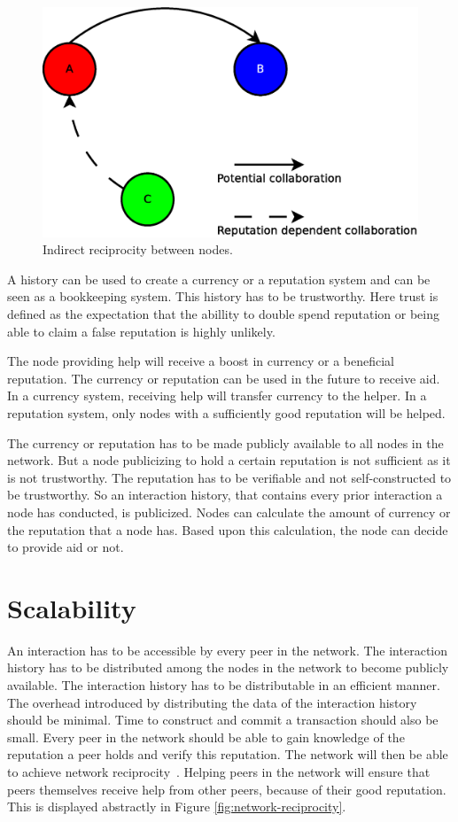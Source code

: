 \begin{figure}
	\centerline{\includegraphics[scale=0.3]{problemDescription/figs/indirect-reciprocity.eps}}
	\caption{Indirect reciprocity between nodes.}
	\label{fig:indirect-reciprocity}
\end{figure}

A history can be used to create a currency or a reputation system
and can be seen as a bookkeeping system.
This history has to be trustworthy.
Here trust is defined as the expectation that the abillity to double spend reputation
or being able to claim a false reputation is highly unlikely.

The node providing help will receive a boost in currency or a beneficial reputation.
The currency or reputation can be used in the future to receive aid.
In a currency system, receiving help will transfer currency to the helper.
In a reputation system, only nodes with a sufficiently good reputation will be helped.

The currency or reputation has to be made publicly available to all nodes in the network.
But a node publicizing to hold a certain reputation is not sufficient as it is not trustworthy.
The reputation has to be verifiable and not self-constructed to be trustworthy.
So an interaction history, that contains every prior interaction a node has conducted, is publicized.
Nodes can calculate the amount of currency or the reputation that a node has.
Based upon this calculation, the node can decide to provide aid or not.

\section{Scalability}
An interaction has to be accessible by every peer in the network.
The interaction history has to be distributed among the nodes in the network
to become publicly available.
The interaction history has to be distributable in an efficient manner.
The overhead introduced by distributing the data of the interaction history should be minimal.
Time to construct and commit a transaction should also be small.
Every peer in the network should be able to gain knowledge of the reputation a peer holds and verify this reputation.
The network will then be able to achieve network reciprocity~\cite{Nowak-Cooperation}.
Helping peers in the network will ensure that peers themselves receive help from other peers,
because of their good reputation.
This is displayed abstractly in Figure \ref{fig:network-reciprocity}.

